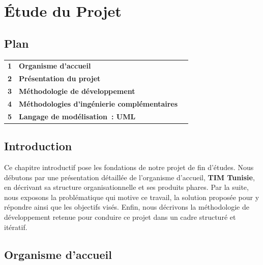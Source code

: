 
\chapter{Étude du Projet}

\section*{Plan}

\begin{tabular}{r l r}
\textbf{1} & \textbf{Organisme d'accueil} & \textbf{\pageref{sec:organisme}} \\
\textbf{2} & \textbf{Présentation du projet} & \textbf{\pageref{sec:projet_overview}} \\
\textbf{3} & \textbf{Méthodologie de développement} & \textbf{\pageref{sec:methodologie}} \\
\textbf{4} & \textbf{Méthodologies d'ingénierie complémentaires} & \textbf{\pageref{sec:methodologies_complementaires}} \\
\textbf{5} & \textbf{Langage de modélisation~: UML} & \textbf{\pageref{sec:uml}} \\
\end{tabular}

\section*{Introduction}

Ce chapitre introductif pose les fondations de notre projet de fin d'études. Nous débutons par une présentation détaillée de l'organisme d'accueil, \textbf{TIM Tunisie}, en décrivant sa structure organisationnelle et ses produits phares. Par la suite, nous exposons la problématique qui motive ce travail, la solution proposée pour y répondre ainsi que les objectifs visés. Enfin, nous décrivons la méthodologie de développement retenue pour conduire ce projet dans un cadre structuré et itératif.

\section{Organisme d'accueil}
\label{sec:organisme}

